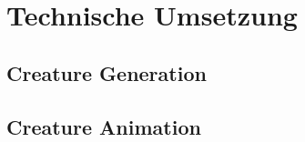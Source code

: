 \chapter{Technische Umsetzung}
\label{Technische_Umsetzung}

\section{Creature Generation}


\section{Creature Animation}

